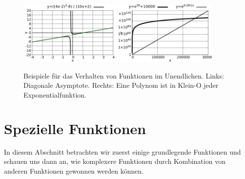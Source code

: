 \begin{figure}
    \centering
    \includegraphics[width=0.45\textwidth]{./gnuplot/diagonal-asymptote}
    \includegraphics[width=0.45\textwidth]{./gnuplot/example-little-o}
    \caption[Verhalten im Unendlichen]{Beispiele für das Verhalten von Funktionen im Unendlichen. Links: Diagonale Asymptote. Rechts: Eine Polynom ist in Klein-O jeder Exponentialfunktion.}
    \label{fig:BehLargeValFun}
\end{figure}

\section{Spezielle Funktionen}

In diesem Abschnitt betrachten wir zuerst einige grundlegende Funktionen und schauen uns dann an, wie komplexere Funktionen durch Kombination von anderen Funktionen gewonnen werden können.

